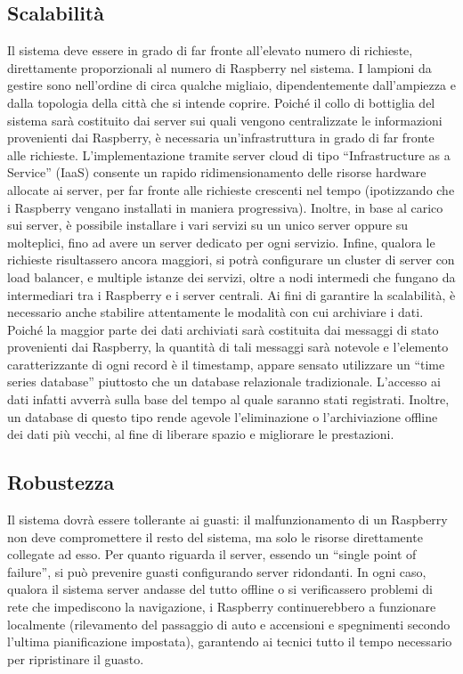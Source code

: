 \subsection{Scalabilità}
Il sistema deve essere in grado di far fronte all'elevato numero di richieste, direttamente proporzionali al numero di Raspberry nel sistema. I lampioni da gestire sono nell'ordine di circa qualche migliaio, dipendentemente dall'ampiezza e dalla topologia della città che si intende coprire. Poiché il collo di bottiglia del sistema sarà costituito dai server sui quali vengono centralizzate le informazioni provenienti dai Raspberry, è necessaria un'infrastruttura in grado di far fronte alle richieste.
L'implementazione tramite server cloud di tipo ``Infrastructure as a Service'' (IaaS) consente un rapido ridimensionamento delle risorse hardware allocate ai server, per far fronte alle richieste crescenti nel tempo (ipotizzando che i Raspberry vengano installati in maniera progressiva). Inoltre, in base al carico sui server, è possibile installare i vari servizi su un unico server oppure su molteplici, fino ad avere un server dedicato per ogni servizio. Infine, qualora le richieste risultassero ancora maggiori, si potrà configurare un cluster di server con load balancer, e multiple istanze dei servizi, oltre a nodi intermedi che fungano da intermediari tra i Raspberry e i server centrali.
Ai fini di garantire la scalabilità, è necessario anche stabilire attentamente le modalità con cui archiviare i dati. Poiché la maggior parte dei dati archiviati sarà costituita dai messaggi di stato provenienti dai Raspberry, la quantità di tali messaggi sarà notevole e l'elemento caratterizzante di ogni record è il timestamp, appare sensato utilizzare un ``time series database'' piuttosto che un database relazionale tradizionale. L'accesso ai dati infatti avverrà sulla base del tempo al quale saranno stati registrati. Inoltre, un database di questo tipo rende agevole l'eliminazione o l'archiviazione offline dei dati più vecchi, al fine di liberare spazio e migliorare le prestazioni.
\subsection{Robustezza}
Il sistema dovrà essere tollerante ai guasti: il malfunzionamento di un Raspberry non deve compromettere il resto del sistema, ma solo le risorse direttamente collegate ad esso. Per quanto riguarda il server, essendo un ``single point of failure'', si può prevenire guasti configurando server ridondanti. In ogni caso, qualora il sistema server andasse del tutto offline o si verificassero problemi di rete che impediscono la navigazione, i Raspberry continuerebbero a funzionare localmente (rilevamento del passaggio di auto e accensioni e spegnimenti secondo l'ultima pianificazione impostata), garantendo ai tecnici tutto il tempo necessario per ripristinare il guasto.
